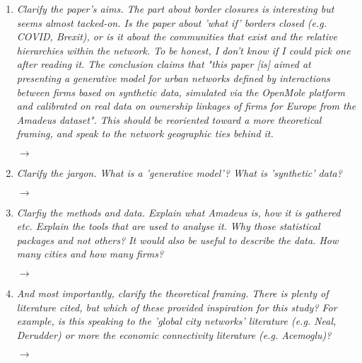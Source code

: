 \documentclass[10pt,a4paper,sans]{moderncv}        %
\begin{document}
\begin{enumerate}
	

	\item \textit{Clarify the paper's aims. The part about border closures is interesting but seems almost tacked-on. Is the paper about 'what if' borders closed (e.g. COVID, Brexit), or is it about the communities that exist and the relative hierarchies within the network. To be honest, I don't know if I could pick one after reading it. The conclusion claims that "this paper [is] aimed at presenting a generative model for urban networks defined by interactions between firms based on synthetic data, simulated via the OpenMole platform and calibrated on real data on ownership linkages of firms for Europe from the Amadeus dataset". This should be reoriented toward a more theoretical framing, and speak to the network geographic ties behind it.}
	
	$\rightarrow$ 
	
	\medskip

	\item \textit{Clarify the jargon. What is a 'generative model'? What is 'synthetic' data?}

	$\rightarrow$ 
	
	\medskip

	\item \textit{Clarfiy the methods and data. Explain what Amadeus is, how it is gathered etc. Explain the tools that are used to analyse it. Why those statistical packages and not others? It would also be useful to describe the data. How many cities and how many firms?}
	
	$\rightarrow$ 
	
	\medskip

	\item \textit{And most importantly, clarify the theoretical framing. There is plenty of literature cited, but which of these provided inspiration for this study? For example, is this speaking to the 'global city networks' literature (e.g. Neal, Derudder) or more the economic connectivity literature (e.g. Acemoglu)?}
	 
	$\rightarrow$
	
	\medskip


\end{enumerate}
\end{document}
